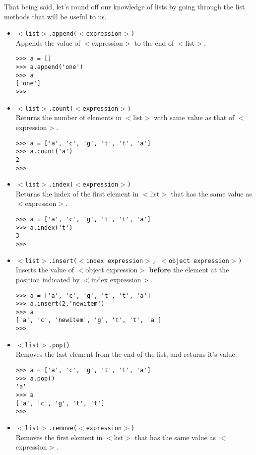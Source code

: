 That being said, let's round off our knowledge of lists by   going through the list methods that will be useful to us.
\begin{itemize}
	\item 
\texttt{$<$list$>$.append($<$expression$>$)}
\\     Appends the value of $<$expression$>$ to the end of     $<$list$>$.      
\begin{lstlisting}
>>> a = []
>>> a.append('one')
>>> a
['one']
>>>
\end{lstlisting}
	\item 
\texttt{$<$list$>$.count($<$expression$>$)}
\\     Returns the number of elements in $<$list$>$ with same value     as that of $<$expression$>$.      
\begin{lstlisting}
>>> a = ['a', 'c', 'g', 't', 't', 'a']
>>> a.count('a')
2
>>>
\end{lstlisting}
	\item 
\texttt{$<$list$>$.index($<$expression$>$)}
\\     Returns the index of the first element in $<$list$>$ that has     the same value as $<$expression$>$.      
\begin{lstlisting}
>>> a = ['a', 'c', 'g', 't', 't', 'a']
>>> a.index('t')
3
>>>
\end{lstlisting}
	\item 
\texttt{$<$list$>$.insert($<$index expression$>$, $<$object     expression$>$)}
\\ Inserts the value of $<$object     expression$>$ \textbf{before} the element at the     position indicated by $<$index expression$>$.      
\begin{lstlisting}
>>> a = ['a', 'c', 'g', 't', 't', 'a']
>>> a.insert(2,'newitem')
>>> a
['a', 'c', 'newitem', 'g', 't', 't', 'a']
>>>
\end{lstlisting}
	\item 
\texttt{$<$list$>$.pop()}
\\ Removes the last element     from the end of the list, and returns it's value.      
\begin{lstlisting}
>>> a = ['a', 'c', 'g', 't', 't', 'a']
>>> a.pop()
'a'
>>> a
['a', 'c', 'g', 't', 't']
>>>
\end{lstlisting}
	\item 
\texttt{$<$list$>$.remove($<$expression$>$)}
\\     Removes the first element in $<$list$>$ that has the same     value as $<$expression$>$.      
\begin{lstlisting}

\end{lstlisting}
\end{itemize}
